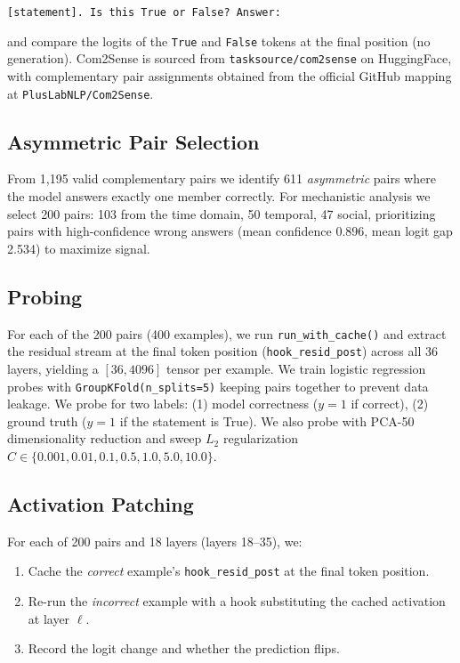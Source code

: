 \documentclass{article}
\begin{document}
\begin{center}
\small\texttt{[statement]. Is this True or False? Answer:}
\end{center}

and compare the logits of the \texttt{True} and \texttt{False} tokens at the final position (no generation). Com2Sense is sourced from \texttt{tasksource/com2sense} on HuggingFace, with complementary pair assignments obtained from the official GitHub mapping at \texttt{PlusLabNLP/Com2Sense}.

\subsection{Asymmetric Pair Selection}

From 1,195 valid complementary pairs we identify 611 \emph{asymmetric} pairs where the model answers exactly one member correctly. For mechanistic analysis we select 200 pairs: 103 from the time domain, 50 temporal, 47 social, prioritizing pairs with high-confidence wrong answers (mean confidence 0.896, mean logit gap 2.534) to maximize signal.

\subsection{Probing}

For each of the 200 pairs (400 examples), we run \texttt{run\_with\_cache()} and extract the residual stream at the final token position (\texttt{hook\_resid\_post}) across all 36 layers, yielding a $[36, 4096]$ tensor per example. We train logistic regression probes with \texttt{GroupKFold(n\_splits=5)} keeping pairs together to prevent data leakage. We probe for two labels: (1) model correctness ($y{=}1$ if correct), (2) ground truth ($y{=}1$ if the statement is True). We also probe with PCA-50 dimensionality reduction and sweep $L_2$ regularization $C \in \{0.001, 0.01, 0.1, 0.5, 1.0, 5.0, 10.0\}$.

\subsection{Activation Patching}

For each of 200 pairs and 18 layers (layers 18--35), we:
\begin{enumerate}
    \item Cache the \emph{correct} example's \texttt{hook\_resid\_post} at the final token position.
    \item Re-run the \emph{incorrect} example with a hook substituting the cached activation at layer $\ell$.
    \item Record the logit change and whether the prediction flips.
\end{enumerate}
\end{document}
